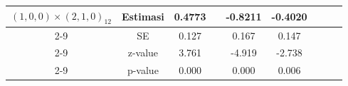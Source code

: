 \begin{enumerate}[label=\alph*.]
\begin{longtable}{|c|c|c|c|c|c|c|c|c|}
            \multirow{4}{*}{$(1,0,0)\times(2,1,0)_{12}$}
            & Estimasi & 0.4773 & {} & -0.8211 & -0.4020 & {} & {} & {}\\ \cline{2-9}
            & SE       & 0.127 & {} & 0.167 & 0.147 & {} & {} & {}\\ \cline{2-9}
            & z-value  & 3.761 & {} & -4.919 & -2.738 & {} & {}& {}\\ \cline{2-9}
            & p-value  & 0.000 & {} & 0.000 & 0.006 & {} & {} & {}\\ \hline
        \end{longtable}
        \normalsize
\end{enumerate}